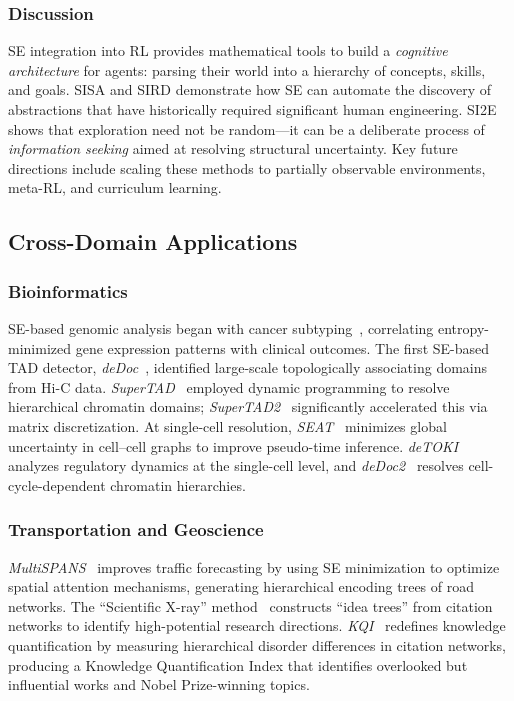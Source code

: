 \subsubsection{Discussion}

SE integration into RL provides mathematical tools to build a \emph{cognitive
architecture} for agents: parsing their world into a hierarchy of concepts,
skills, and goals.
SISA and SIRD demonstrate how SE can automate the discovery of abstractions
that have historically required significant human engineering.
SI2E shows that exploration need not be random---it can be a deliberate
process of \emph{information seeking} aimed at resolving structural
uncertainty.
Key future directions include scaling these methods to partially observable
environments, meta-RL, and curriculum learning.

\subsection{Cross-Domain Applications}
\label{sec:applications}

\subsubsection{Bioinformatics}

SE-based genomic analysis began with cancer subtyping~\cite{li2016cancer},
correlating entropy-minimized gene expression patterns with clinical outcomes.
The first SE-based TAD detector, \emph{deDoc}~\cite{li2018dedoc}, identified
large-scale topologically associating domains from Hi-C data.
\emph{SuperTAD}~\cite{zhang2021supertad} employed dynamic programming to
resolve hierarchical chromatin domains; \emph{SuperTAD2}~\cite{ling2024supertad2}
significantly accelerated this via matrix discretization.
At single-cell resolution, \emph{SEAT}~\cite{chen2022pyseat} minimizes global
uncertainty in cell--cell graphs to improve pseudo-time inference.
\emph{deTOKI}~\cite{li2021detoki} analyzes regulatory dynamics at the
single-cell level, and \emph{deDoc2}~\cite{li2023dedoc2} resolves
cell-cycle-dependent chromatin hierarchies.

\subsubsection{Transportation and Geoscience}

\emph{MultiSPANS}~\cite{zou2024transformer} improves traffic forecasting by
using SE minimization to optimize spatial attention mechanisms, generating
hierarchical encoding trees of road networks.
The ``Scientific X-ray'' method~\cite{wxb2022scientificxray} constructs
``idea trees'' from citation networks to identify high-potential research
directions.
\emph{KQI}~\cite{wang2023quantifyingKnowledge} redefines knowledge
quantification by measuring hierarchical disorder differences in citation
networks, producing a Knowledge Quantification Index that identifies
overlooked but influential works and Nobel Prize-winning topics.

